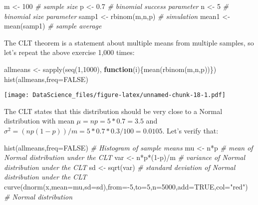 \documentclass[
]{book}
\newenvironment{Shaded}{\begin{snugshade}}{\end{snugshade}}
\newcommand{\AttributeTok}[1]{\textcolor[rgb]{0.77,0.63,0.00}{#1}}
\newcommand{\CommentTok}[1]{\textcolor[rgb]{0.56,0.35,0.01}{\textit{#1}}}
\newcommand{\ConstantTok}[1]{\textcolor[rgb]{0.00,0.00,0.00}{#1}}
\newcommand{\ControlFlowTok}[1]{\textcolor[rgb]{0.13,0.29,0.53}{\textbf{#1}}}
\newcommand{\DecValTok}[1]{\textcolor[rgb]{0.00,0.00,0.81}{#1}}
\newcommand{\FloatTok}[1]{\textcolor[rgb]{0.00,0.00,0.81}{#1}}
\newcommand{\FunctionTok}[1]{\textcolor[rgb]{0.00,0.00,0.00}{#1}}
\newcommand{\NormalTok}[1]{#1}
\newcommand{\OtherTok}[1]{\textcolor[rgb]{0.56,0.35,0.01}{#1}}
\newcommand{\SpecialCharTok}[1]{\textcolor[rgb]{0.00,0.00,0.00}{#1}}
\newcommand{\StringTok}[1]{\textcolor[rgb]{0.31,0.60,0.02}{#1}}
\begin{document}
\begin{Shaded}
\begin{Highlighting}[]
\NormalTok{m }\OtherTok{\textless{}{-}} \DecValTok{100} \CommentTok{\# sample size}
\NormalTok{p }\OtherTok{\textless{}{-}} \FloatTok{0.7} \CommentTok{\# binomial success parameter}
\NormalTok{n }\OtherTok{\textless{}{-}} \DecValTok{5} \CommentTok{\# binomial size parameter}
\NormalTok{samp1 }\OtherTok{\textless{}{-}} \FunctionTok{rbinom}\NormalTok{(m,n,p)  }\CommentTok{\# simulation}
\NormalTok{mean1 }\OtherTok{\textless{}{-}} \FunctionTok{mean}\NormalTok{(samp1) }\CommentTok{\# sample average}
\end{Highlighting}
\end{Shaded}

The CLT theorem is a statement about multiple means from multiple samples, so let's repeat the above exercise 1,000 times:

\begin{Shaded}
\begin{Highlighting}[]
\NormalTok{allmeans }\OtherTok{\textless{}{-}} \FunctionTok{sapply}\NormalTok{(}\FunctionTok{seq}\NormalTok{(}\DecValTok{1}\NormalTok{,}\DecValTok{1000}\NormalTok{), }\ControlFlowTok{function}\NormalTok{(i)\{}\FunctionTok{mean}\NormalTok{(}\FunctionTok{rbinom}\NormalTok{(m,n,p))\})}
\FunctionTok{hist}\NormalTok{(allmeans,}\AttributeTok{freq=}\ConstantTok{FALSE}\NormalTok{)}
\end{Highlighting}
\end{Shaded}

\texttt{[image: DataScience\_files/figure-latex/unnamed-chunk-18-1.pdf]}

The CLT states that this distribution should be very close to a Normal distribution with mean \(\mu = np = 5*0.7 = 3.5\) and \(\sigma^2 = (np(1-p))/m = 5*0.7*0.3/100 = 0.0105\). Let's verify that:

\begin{Shaded}
\begin{Highlighting}[]
\FunctionTok{hist}\NormalTok{(allmeans,}\AttributeTok{freq=}\ConstantTok{FALSE}\NormalTok{) }\CommentTok{\# Histogram of sample means}
\NormalTok{mu }\OtherTok{\textless{}{-}}\NormalTok{ n}\SpecialCharTok{*}\NormalTok{p }\CommentTok{\# mean of Normal distribution under the CLT}
\NormalTok{var }\OtherTok{\textless{}{-}}\NormalTok{ n}\SpecialCharTok{*}\NormalTok{p}\SpecialCharTok{*}\NormalTok{(}\DecValTok{1}\SpecialCharTok{{-}}\NormalTok{p)}\SpecialCharTok{/}\NormalTok{m }\CommentTok{\# variance of Normal distribution under the CLT}
\NormalTok{sd }\OtherTok{\textless{}{-}} \FunctionTok{sqrt}\NormalTok{(var) }\CommentTok{\# standard deviation of Normal distribution under the CLT}
\FunctionTok{curve}\NormalTok{(}\FunctionTok{dnorm}\NormalTok{(x,}\AttributeTok{mean=}\NormalTok{mu,}\AttributeTok{sd=}\NormalTok{sd),}\AttributeTok{from=}\SpecialCharTok{{-}}\DecValTok{5}\NormalTok{,}\AttributeTok{to=}\DecValTok{5}\NormalTok{,}\AttributeTok{n=}\DecValTok{5000}\NormalTok{,}\AttributeTok{add=}\ConstantTok{TRUE}\NormalTok{,}\AttributeTok{col=}\StringTok{"red"}\NormalTok{) }\CommentTok{\# Normal distribution}
\end{Highlighting}
\end{Shaded}
\end{document}
